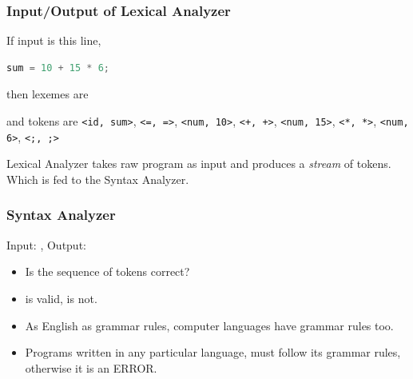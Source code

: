 \begin{frame}[fragile]
  \frametitle{Input/Output of Lexical Analyzer}
    If input is this line,

    \begin{lstlisting}[language=C, frame=leftline,]
    sum = 10 + 15 * 6;
\end{lstlisting}

    \begin{block}{then lexemes are}
         \DCode{=}  \DCode{+}  \DCode{*}  \DCodeb{;}
    \end{block}

    \begin{block}{and tokens are}
        \texttt{<id, sum>}, \texttt{<=, =>}, \texttt{<num, 10>}, \texttt{<+, +>}, \texttt{<num, 15>}, \texttt{<*, *>}, \texttt{<num, 6>}, \texttt{<;, ;>}
    \end{block}

    Lexical Analyzer takes raw program as input and produces a \textit{stream} of tokens. Which is fed to the Syntax Analyzer.

\end{frame}



\begin{frame}
  \frametitle{Syntax Analyzer}
    \begin{block}{}
        Input: , Output: 

    \end{block}

    \begin{itemize}
        \item<2-> Is the sequence of tokens correct?
        \item<3->  is valid,  is not.
        \item<4-> As English as grammar rules, computer languages have grammar rules too.
        \item<5-> Programs written in any particular language, must follow its grammar rules, otherwise it is an ERROR.

    \end{itemize}
\end{frame}


